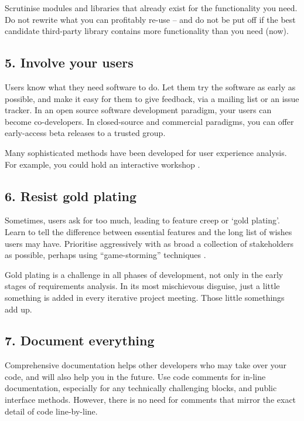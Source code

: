 \documentclass{bmcart}
\begin{document}
Scrutinise modules and libraries that already exist for the functionality you need. Do not rewrite what you can profitably re-use -- and do not be put off if the best candidate third-party library contains more functionality than you need (now).  

\subsection*{5. Involve your users}

Users know what they need software to do. Let them try the software as early as possible, and make it easy for them to give feedback, via a mailing list or an issue tracker. In an open source software development paradigm, your users can become co-developers. In closed-source and commercial paradigms, you can offer early-access beta releases to a trusted group.  

Many sophisticated methods have been developed for user experience analysis. For example, you could hold an interactive workshop \cite{pavelin2014}. 

\subsection*{6. Resist gold plating}

Sometimes, users ask for too much, leading to feature creep or `gold plating'. Learn to tell the difference between essential features and the long list of wishes users may have. Prioritise aggressively with as broad a collection of stakeholders as possible, perhaps using ``game-storming'' techniques \cite{gamestorm}.   

Gold plating is a challenge in all phases of development, not only in the early stages of requirements analysis. In its most mischievous disguise, just a little something is added in every iterative project meeting. Those little somethings add up. 

\subsection*{7. Document everything}

Comprehensive documentation helps other developers who may take over your code, and will also help you in the future. Use code comments for in-line documentation, especially for any technically challenging blocks, and public interface methods. However, there is no need for comments that mirror the exact detail of code line-by-line. 
\end{document}
